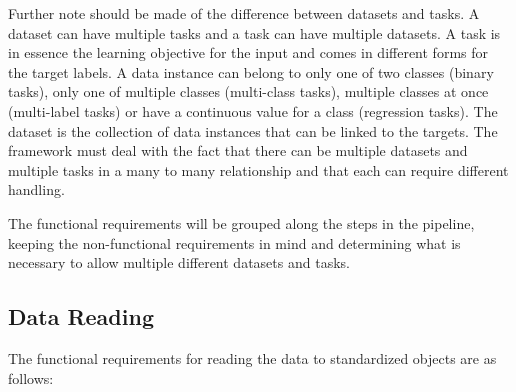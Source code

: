 Further note should be made of the difference between datasets and tasks. A dataset can have multiple tasks and a task can have multiple datasets. A task is in essence the learning objective for the input and comes in different forms for the target labels. A data instance can belong to only one of two classes (binary tasks), only one of multiple classes (multi-class tasks), multiple classes at once (multi-label tasks) or have a continuous value for a class (regression tasks). The dataset is the collection of data instances that can be linked to the targets. The framework must deal with the fact that there can be multiple datasets and multiple tasks in a many to many relationship and that each can require different handling. 

The functional requirements will be grouped along the steps in the pipeline, keeping the non-functional requirements in mind and determining what is necessary to allow multiple different datasets and tasks. \\


\subsection{Data Reading}

The functional requirements for reading the data to standardized objects are as follows:


